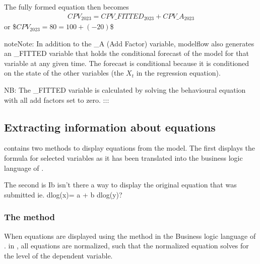 \documentclass[letterpaper,10pt,english]{jupyterBook}
\begin{document}
\sphinxAtStartPar
The fully formed equation then becomes
\begin{equation*}
\begin{split}CPV_{2023} =  CPV\_FITTED_{2023} + CPV\_A_{2023}\end{split}
\end{equation*}
\sphinxAtStartPar
or
\$\(CPV_{2023} =  80= 100 + (-20) \)\$

\begin{sphinxadmonition}{note}{Note:}
\sphinxAtStartPar
In addition to the \_A (Add Factor) variable, modelflow also generates an \_FITTED variable that holds the conditional forecast of the model for that variable at any given time.  The forecast is conditional because it is conditioned on the state of the other variables (the \(X_t\) in the regression equation).

\sphinxAtStartPar
NB: The \_FITTED variable is calculated by solving the behavioural equation with all add factors set to zero. :::
\end{sphinxadmonition}


\subsection{Extracting information about equations}
\label{\detokenize{content/05_SimpleModel/SimpleModel:extracting-information-about-equations}}
\sphinxAtStartPar
{} contains two methods to display equations from the model.  The first  displays the formula for selected variables as it has been translated into the business logic language of .

\sphinxAtStartPar
The second is  Ib isn’t there a way to display the original equation that was submitted ie. dlog(x)= a + b dlog(y)? 


\subsubsection{The  method}
\label{\detokenize{content/05_SimpleModel/SimpleModel:the-frml-method}}
\sphinxAtStartPar
When equations are displayed using the  method in the Business logic language of . in , all equations are normalized, such that the normalized equation solves for the level of the dependent variable.
\end{document}

